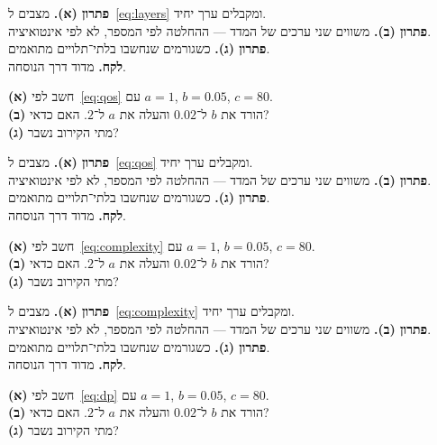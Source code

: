 \begin{keybox}[frametitle={פתרון 9},nobreak=true]
\textbf{פתרון (א).} מצבים ל~\eqref{eq:layers} ומקבלים ערך יחיד.\\[2pt]
\textbf{פתרון (ב).} משווים שני ערכים של המדד — ההחלטה לפי המספר, לא לפי אינטואיציה.\\[2pt]
\textbf{פתרון (ג).} כשגורמים שנחשבו בלתי־תלויים מתואמים.\\[2pt]
\textbf{לקח.} מדוד דרך הנוסחה.
\end{keybox}


\begin{exbox}[frametitle={תרגיל 10 — \en{latency}}]
\textbf{(א)} חשב לפי~\eqref{eq:qos} עם $a=1$, $b=0.05$, $c=80$.\\[3pt]
\textbf{(ב)} הורד את $b$ ל־$0.02$ והעלה את $a$ ל־$2$. האם כדאי?\\[3pt]
\textbf{(ג)} מתי הקירוב נשבר?
\end{exbox}

\begin{keybox}[frametitle={פתרון 10},nobreak=true]
\textbf{פתרון (א).} מצבים ל~\eqref{eq:qos} ומקבלים ערך יחיד.\\[2pt]
\textbf{פתרון (ב).} משווים שני ערכים של המדד — ההחלטה לפי המספר, לא לפי אינטואיציה.\\[2pt]
\textbf{פתרון (ג).} כשגורמים שנחשבו בלתי־תלויים מתואמים.\\[2pt]
\textbf{לקח.} מדוד דרך הנוסחה.
\end{keybox}


\begin{exbox}[frametitle={תרגיל 11 — \en{BigO}}]
\textbf{(א)} חשב לפי~\eqref{eq:complexity} עם $a=1$, $b=0.05$, $c=80$.\\[3pt]
\textbf{(ב)} הורד את $b$ ל־$0.02$ והעלה את $a$ ל־$2$. האם כדאי?\\[3pt]
\textbf{(ג)} מתי הקירוב נשבר?
\end{exbox}

\begin{keybox}[frametitle={פתרון 11},nobreak=true]
\textbf{פתרון (א).} מצבים ל~\eqref{eq:complexity} ומקבלים ערך יחיד.\\[2pt]
\textbf{פתרון (ב).} משווים שני ערכים של המדד — ההחלטה לפי המספר, לא לפי אינטואיציה.\\[2pt]
\textbf{פתרון (ג).} כשגורמים שנחשבו בלתי־תלויים מתואמים.\\[2pt]
\textbf{לקח.} מדוד דרך הנוסחה.
\end{keybox}


\begin{exbox}[frametitle={תרגיל 12 — \en{opt}}]
\textbf{(א)} חשב לפי~\eqref{eq:dp} עם $a=1$, $b=0.05$, $c=80$.\\[3pt]
\textbf{(ב)} הורד את $b$ ל־$0.02$ והעלה את $a$ ל־$2$. האם כדאי?\\[3pt]
\textbf{(ג)} מתי הקירוב נשבר?
\end{exbox}

